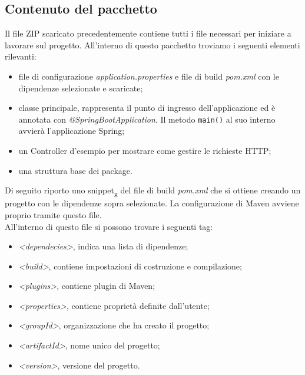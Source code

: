 \subsection{Contenuto del pacchetto}
Il file ZIP scaricato precedentemente contiene tutti i file necessari per iniziare a lavorare sul progetto. All'interno di questo pacchetto troviamo i seguenti elementi rilevanti:
\begin{itemize}
\item file di configurazione \textit{application.properties} e file di build \textit{pom.xml} con le dipendenze selezionate e scaricate;
\item classe principale, rappresenta il punto di ingresso dell'applicazione ed è annotata con \textit{@SpringBootApplication}. Il metodo \texttt{main()} al suo interno avvierà l'applicazione Spring;
\item un Controller d'esempio per mostrare come gestire le richieste HTTP;
\item una struttura base dei package.
\end{itemize}
Di seguito riporto uno snippet\textsubscript{g} del file di build \textit{pom.xml} che si ottiene creando un progetto con le dipendenze sopra selezionate. La configurazione di Maven avviene proprio tramite questo file.\\
All'interno di questo file si possono trovare i seguenti tag:
\begin{itemize}
\item \textit{<dependecies>}, indica una lista di dipendenze;
\item \textit{<build>}, contiene impostazioni di costruzione e compilazione;
\item \textit{<plugins>}, contiene plugin di Maven;
\item \textit{<properties>}, contiene proprietà definite dall'utente;
\item \textit{<groupId>}, organizzazione che ha creato il progetto;
\item \textit{<artifactId>}, nome unico del progetto;
\item \textit{<version>},  versione del progetto.
\end{itemize}

